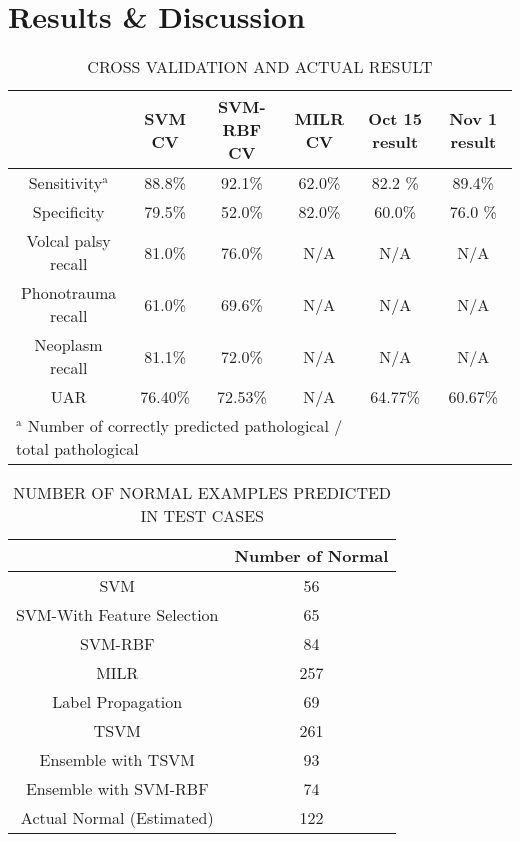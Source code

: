 \section{Results \& Discussion}
\begin{table*}[htbp]
	\caption{CROSS VALIDATION AND ACTUAL RESULT}
	\begin{center}
		\begin{tabular}{|c|c|c|c|c|c|}
			\hline
			 & SVM CV & SVM-RBF CV & MILR CV & Oct 15 result & Nov 1 result \\
			\hline
			Sensitivity$^{\mathrm{a}}$  & 88.8\%& 92.1\% & 62.0\% & 82.2 \% & 89.4\% \\
			\hline
			Specificity & 79.5\% & 52.0\%& 82.0\%& 60.0\% & 76.0 \% \\
			\hline
			Volcal palsy recall & 81.0\% &76.0\%& N/A & N/A & N/A \\
			\hline
			Phonotrauma recall & 61.0\% &69.6\%& N/A& N/A& N/A\\
			\hline
			Neoplasm recall & 81.1\% & 72.0\%& N/A& N/A& N/A \\
			\hline
			UAR & 76.40\% &72.53\% & N/A& 64.77\% & 60.67\%\\
			\hline
			\multicolumn{4}{l}{$^{\mathrm{a}}$ Number of correctly predicted pathological / total pathological}
		\end{tabular}
		\label{tab:1}
	\end{center}
\end{table*}

\begin{table*}[htbp]
	\caption{NUMBER OF NORMAL EXAMPLES PREDICTED IN TEST CASES}
	\begin{center}
		\begin{tabular}{|c|c|}
			\hline
			& Number of Normal \\
			\hline
			SVM & 56\\
			\hline
			SVM-With Feature Selection & 65\\
			\hline
			SVM-RBF & 84 \\
			\hline
			MILR & 257 \\
			\hline
			Label Propagation & 69 \\
			\hline
			TSVM & 261 \\
			\hline
			Ensemble with TSVM & 93\\
			\hline
			Ensemble with SVM-RBF & 74\\
			\hline
			Actual Normal (Estimated)& 122 \\
			\hline
		\end{tabular}
		\label{tab:2}
	\end{center}
\end{table*}


